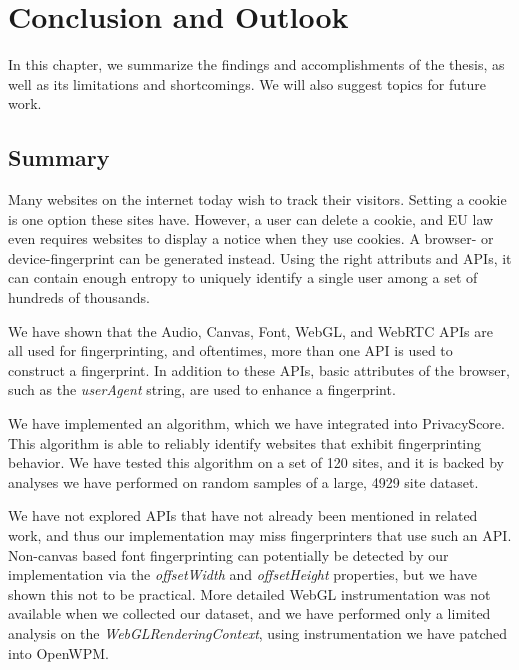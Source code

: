 \documentclass[
    fontsize=12pt,
    headings=small,
    parskip=half,
    bibliography=totoc,
    numbers=noenddot,
    open=any
    ]{scrreprt}
\begin{document}

\chapter{Conclusion and Outlook}
\label{chap:conclusion}
In this chapter, we summarize the findings and accomplishments of the thesis,
as well as its limitations and shortcomings. We will also suggest topics for future work.

\section{Summary}
Many websites on the internet today wish to track their visitors. Setting a cookie
is one option these sites have. However, a user can delete a cookie, and EU law
even requires websites to display a notice when they use cookies.
A browser- or device-fingerprint can be generated instead. Using the right attributs
and APIs, it can contain enough entropy to uniquely identify a single user among a set
of hundreds of thousands.

We have shown that the Audio, Canvas, Font, WebGL, and WebRTC APIs are all used
for fingerprinting, and oftentimes, more than one API is used to construct a fingerprint.
In addition to these APIs, basic attributes of the browser, such as the \textit{userAgent}
string, are used to enhance a fingerprint.

We have implemented an algorithm, which we have integrated into PrivacyScore. This algorithm
is able to reliably identify websites that exhibit fingerprinting behavior.
We have tested this algorithm on a set of 120 sites, and it is backed by analyses we have performed
on random samples of a large, 4929 site dataset.

We have not explored APIs that have not already been mentioned in related work, and thus
our implementation may miss fingerprinters that use such an API.
Non-canvas based font fingerprinting can potentially be detected by our implementation
via the \textit{offsetWidth} and \textit{offsetHeight} properties, but we have shown
this not to be practical.
More detailed WebGL instrumentation was not available when we collected our dataset,
and we have performed only a limited analysis on the \textit{WebGLRenderingContext},
using instrumentation we have patched into OpenWPM.
\end{document}
